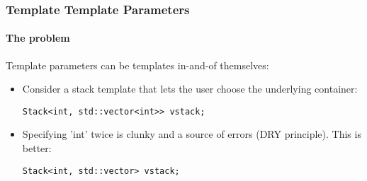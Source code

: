 \begin{frame}[fragile,t]
\frametitle{Template Template Parameters}
\framesubtitle{The problem}
Template parameters can be templates in-and-of themselves:
\begin{itemize}[<+->]
\item Consider a stack template that lets the user choose the
  underlying container:
{\scriptsize
\begin{verbatim}
Stack<int, std::vector<int>> vstack;
\end{verbatim}
}
\vskip 12pt
\item Specifying 'int' twice is clunky and a source of errors (DRY
  principle).  This is better:
{\scriptsize
\begin{verbatim}
Stack<int, std::vector> vstack;
\end{verbatim}
}

\end{itemize}
\end{frame}

